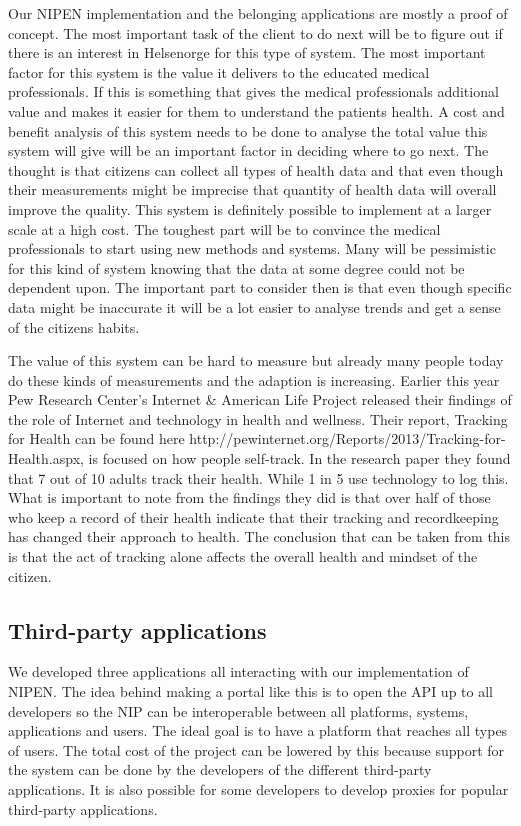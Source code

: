 \iffalse
Our NIPEN implementation and the belonging applications are mostly a proof of concept. 
The most important task of the client to do next will be to figure out if there is an interest in Helsenorge for this type of system.
The most important factor for this system is the value it delivers to the educated medical professionals. 
If this is something that gives the medical professionals additional value and makes it easier for them to understand the patients health. 
A cost and benefit analysis of this system needs to be done to analyse the total value this system will give will be an important factor in deciding where to go next.
The thought is that citizens can collect all types of health data and that even though their measurements might be imprecise that quantity of health data will overall improve the quality.
This system is definitely possible to implement at a larger scale at a high cost.
The toughest part will be to convince the medical professionals to start using new methods and systems. 
Many will be pessimistic for this kind of system knowing that the data at some degree could not be dependent upon.
The important part to consider then is that even though specific data might be inaccurate it will be a lot easier to analyse trends and get a sense of the citizens habits. 

The value of this system can be hard to measure but already many people today do these kinds of measurements and the adaption is increasing. 
Earlier this year Pew Research Center’s Internet \& American Life Project released their findings of the role of Internet and technology in health and wellness. 
Their report, Tracking for Health can be found here http://pewinternet.org/Reports/2013/Tracking-for-Health.aspx, is focused on how people self-track.
In the research paper they found that 7 out of 10 adults track their health.
While 1 in 5 use technology to log this. 
What is important to note from the findings they did is that over half of those who keep a record of their health indicate that their tracking and recordkeeping has changed their approach to health.
The conclusion that can be taken from this is that the act of tracking alone affects the overall health and mindset of the citizen. 

\subsection{Third-party applications}

We developed three applications all interacting with our implementation of NIPEN. 
The idea behind making a portal like this is to open the API up to all developers so the NIP can be interoperable between all platforms, systems, applications and users. 
The ideal goal is to have a platform that reaches all types of users. 
The total cost of the project can be lowered by this because support for the system can be done by the developers of the different third-party applications. 
It is also possible for some developers to develop proxies for popular third-party applications.


